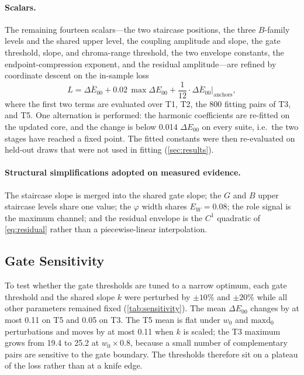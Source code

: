 \paragraph{Scalars.}
The remaining fourteen scalars---the two staircase positions, the three $B$-family levels and the shared upper level, the coupling amplitude and slope, the gate threshold, slope, and chroma-range threshold, the two envelope constants, the endpoint-compression exponent, and the residual amplitude---are refined by coordinate descent on the in-sample loss
\begin{equation}
L=\overline{\Delta E_{00}}+0.02\,\max\Delta E_{00}+\frac{1}{12}\cdot\overline{\Delta E_{00}}\big|_{\text{anchors}},
\label{eq:loss}
\end{equation}
where the first two terms are evaluated over T1, T2, the 800 fitting pairs of T3, and T5. One alternation is performed: the harmonic coefficients are re-fitted on the updated core, and the change is below 0.014 $\Delta E_{00}$ on every suite, i.e.\ the two stages have reached a fixed point. The fitted constants were then re-evaluated on held-out draws that were not used in fitting (\cref{sec:results}).

\paragraph{Structural simplifications adopted on measured evidence.}
The staircase slope is merged into the shared gate slope; the $G$ and $B$ upper staircase levels share one value; the $\varphi$ width shares $E_{W}=0.08$; the role signal is the maximum channel; and the residual envelope is the $C^{1}$ quadratic of \cref{eq:residual} rather than a piecewise-linear interpolation.

\subsection{Gate Sensitivity}
\label{sec:sensitivity}

To test whether the gate thresholds are tuned to a narrow optimum, each gate threshold and the shared slope $k$ were perturbed by $\pm10\%$ and $\pm20\%$ while all other parameters remained fixed (\cref{tab:sensitivity}). The mean $\Delta E_{00}$ changes by at most 0.11 on T5 and 0.05 on T3. The T5 mean is flat under $w_{0}$ and $\mathrm{maxd}_{0}$ perturbations and moves by at most 0.11 when $k$ is scaled; the T3 maximum grows from 19.4 to 25.2 at $w_{0}\times0.8$, because a small number of complementary pairs are sensitive to the gate boundary. The thresholds therefore sit on a plateau of the loss rather than at a knife edge.

